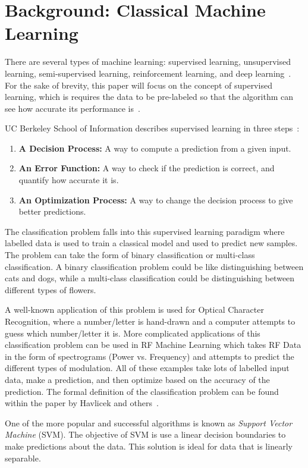 \documentclass[11pt]{article}
\begin{document}
\section{Background: Classical Machine Learning}\label{bg_svm}

There are several types of machine learning: supervised learning, unsupervised learning, semi-supervised learning,
reinforcement learning, and deep learning~\cite{ucberkeley}. For the sake of brevity, this paper will focus on the concept
of supervised learning, which is requires the data to be pre-labeled so that the algorithm can see how accurate its
performance is~\cite{ucberkeley}.

 UC Berkeley School of Information describes supervised learning in three steps~\cite{ucberkeley}:
 \begin{enumerate}
    \item \textbf{A Decision Process:} A way to compute a prediction from a given input. 
    \item \textbf{An Error Function:} A way to check if the prediction is correct, and quantify how accurate it is.
    \item \textbf{An Optimization Process:} A way to change the decision process to give better predictions.
 \end{enumerate}

The classification problem falls into this supervised learning paradigm where labelled data is used to train a classical model 
and used to predict new samples. The problem can take the form of binary classification or multi-class classification. A binary
classification problem could be like distinguishing between cats and dogs, while a multi-class classification could be distinguishing
between different types of flowers.

A well-known application of this problem is used for Optical Character Recognition, where
a number/letter is hand-drawn and a computer attempts to guess which number/letter it is. More complicated applications of this
classification problem can be used in RF Machine Learning which takes RF Data in the form of spectrograms (Power vs. Frequency)
and attempts to predict the different types of modulation. All of these examples take lots of labelled input data, make a prediction, 
and then optimize based on the accuracy of the prediction. The formal definition of the classification problem can be found within 
the paper by Havlicek and others~\cite{Havl_ek_2019}.

One of the more popular and successful algorithms is known as \textit{Support Vector Machine} (SVM). The objective of SVM is use a 
linear decision boundaries to make predictions about the data. This solution is ideal for data that is linearly separable.
\end{document}
